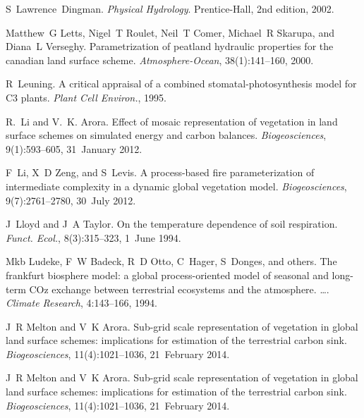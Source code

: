 \begin{DoxyDescription}
\item[\label{_CITEREF_Lawrence_Dingman2002-sq}%
\mbox{[}49\mbox{]}]S~Lawrence~Dingman. {\itshape Physical Hydrology}. Prentice-\/\+Hall, 2nd edition, 2002.


\item[\label{_CITEREF_Letts2000-pg}%
\mbox{[}50\mbox{]}]Matthew~G Letts, Nigel~T Roulet, Neil~T Comer, Michael~R Skarupa, and Diana~L Verseghy. Parametrization of peatland hydraulic properties for the canadian land surface scheme. {\itshape Atmosphere-\/\+Ocean}, 38(1)\+:141--160, 2000. 


\item[\label{_CITEREF_Leuning1995-ab}%
\mbox{[}51\mbox{]}]R~Leuning. A critical appraisal of a combined stomatal-\/photosynthesis model for C3 plants. {\itshape Plant Cell Environ.}, 1995.


\item[\label{_CITEREF_Li2012-f7f}%
\mbox{[}52\mbox{]}]R.~Li and V.~K. Arora. Effect of mosaic representation of vegetation in land surface schemes on simulated energy and carbon balances. {\itshape Biogeosciences}, 9(1)\+:593--605, 31~January 2012. 


\item[\label{_CITEREF_Li20121c2}%
\mbox{[}53\mbox{]}]F~Li, X~D Zeng, and S~Levis. A process-\/based fire parameterization of intermediate complexity in a dynamic global vegetation model. {\itshape Biogeosciences}, 9(7)\+:2761--2780, 30~July 2012. 


\item[\label{_CITEREF_Lloyd1994-ct}%
\mbox{[}54\mbox{]}]J~Lloyd and J~A Taylor. On the temperature dependence of soil respiration. {\itshape Funct. Ecol.}, 8(3)\+:315--323, 1~June 1994. 


\item[\label{_CITEREF_Ludeke1994-px}%
\mbox{[}55\mbox{]}]Mkb Ludeke, F~W Badeck, R~D Otto, C~Hager, S~Donges, and others. The frankfurt biosphere model\+: a global process-\/oriented model of seasonal and long-\/term C\+Oz exchange between terrestrial ecosystems and the atmosphere. …. {\itshape Climate Research}, 4\+:143--166, 1994.


\item[\label{_CITEREF_Melton2014-xk}%
\mbox{[}56\mbox{]}]J~R Melton and V~K Arora. Sub-\/grid scale representation of vegetation in global land surface schemes\+: implications for estimation of the terrestrial carbon sink. {\itshape Biogeosciences}, 11(4)\+:1021--1036, 21~February 2014. 


\item[\label{_CITEREF_Melton2014-xy}%
\mbox{[}57\mbox{]}]J~R Melton and V~K Arora. Sub-\/grid scale representation of vegetation in global land surface schemes\+: implications for estimation of the terrestrial carbon sink. {\itshape Biogeosciences}, 11(4)\+:1021--1036, 21~February 2014. 



\end{DoxyDescription}
